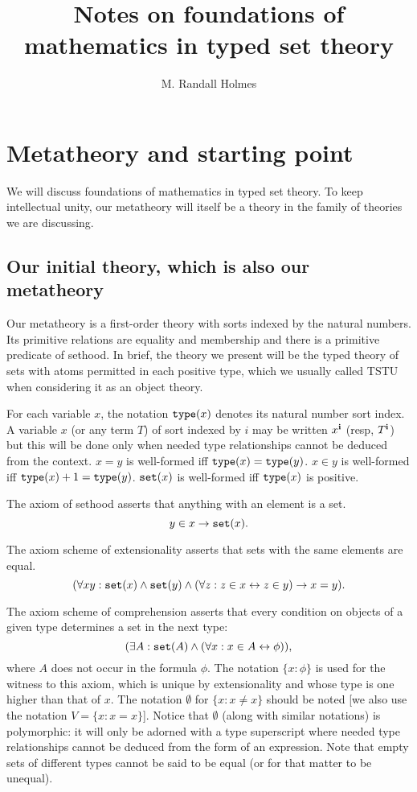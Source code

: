 \documentclass[12pt]{article}
\title{Notes on foundations of mathematics in typed set theory}
\author{M. Randall Holmes}
\begin{document}
\maketitle

\tableofcontents

\section{Metatheory and starting point}

We will discuss foundations of mathematics in typed set theory.  To keep intellectual unity, our metatheory will itself be a theory in the family of theories we are discussing.

\subsection{Our initial theory, which is also our metatheory}

Our metatheory is a first-order theory with sorts indexed by the natural numbers.  Its primitive relations are equality and membership and there is a primitive predicate of sethood.   In brief, the theory we present will be the typed theory of sets with atoms permitted in each positive type, which we usually called TSTU when considering it as an object theory.

For each variable $x$, the notation ${\tt type}(x)$ denotes its natural number sort index.  A variable $x$ (or any term $T$) of sort indexed by $i$ may be written $x^{\bf i}$ (resp, $T^{\bf i}$) but this will be done only when needed type relationships cannot be deduced from the context.  $x=y$ is well-formed iff ${\tt type}(x) = {\tt type}(y)$.  $x \in y$ is well-formed iff
${\tt type}(x)+1 = {\tt type}(y)$.  ${\tt set}(x)$ is well-formed iff ${\tt type}(x)$ is positive.

The axiom of sethood asserts that anything with an element is a set.  $$y \in x \rightarrow {\tt set}(x).$$

The axiom scheme of extensionality asserts that sets with the same elements are equal.  $$(\forall xy:{\tt set}(x) \wedge {\tt set}(y) \wedge (\forall z:z \in x \leftrightarrow z \in y) \rightarrow x=y).$$

The axiom scheme of comprehension asserts that every condition on objects of a given type determines a set in the next type:  $$(\exists A:{\tt set}(A) \wedge (\forall x:x \in A \leftrightarrow \phi)),$$  where $A$ does not occur in the formula $\phi$.  The notation $\{x :\phi\}$ is used for the witness to this axiom, which is unique by extensionality and whose type is one higher than that of $x$.  The notation $\emptyset$ for $\{x:x \neq x\}$ should be noted [we also use the notation $V=\{x:x=x\}$].  Notice that $\emptyset$ (along with similar notations) is polymorphic:  it will only be adorned with a type superscript where needed type relationships cannot be deduced from the form of an expression.  Note that empty sets of different types cannot be said to be equal (or for that matter to be unequal).
\end{document}
